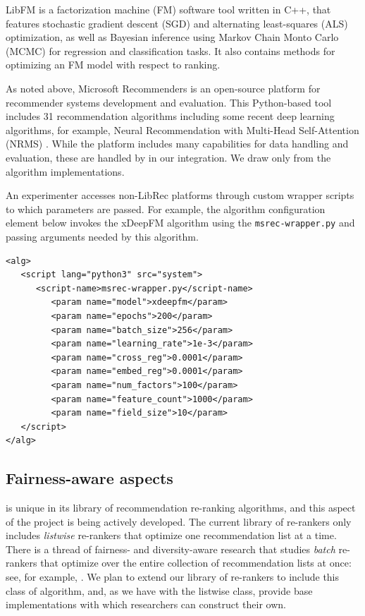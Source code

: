 LibFM\cite{rendle2012factorization} is a factorization machine (FM) software tool written in C++, that features stochastic gradient descent (SGD) and alternating least-squares (ALS) optimization, as well as Bayesian inference using Markov Chain Monto Carlo (MCMC) for regression and classification tasks. It also contains methods for optimizing an FM model with respect to ranking. 


As noted above, Microsoft Recommenders \cite{MicrosoftRecommenders} is an open-source platform for recommender systems development and evaluation. This Python-based tool includes 31 recommendation algorithms including some recent deep learning algorithms, for example, Neural Recommendation with Multi-Head Self-Attention (NRMS) \cite{wu2019neural}. While the platform includes many capabilities for data handling and evaluation, these are handled by \libauto{} in our integration. We draw only from the algorithm implementations. 

An experimenter accesses non-LibRec platforms through custom wrapper scripts to which parameters are passed. For example, the algorithm configuration element below invokes the xDeepFM algorithm using the \texttt{msrec-wrapper.py} and passing arguments needed by this algorithm.

{\small
\begin{verbatim}
<alg>
   <script lang="python3" src="system">
      <script-name>msrec-wrapper.py</script-name>
         <param name="model">xdeepfm</param>
         <param name="epochs">200</param>
         <param name="batch_size">256</param>
         <param name="learning_rate">1e-3</param>
         <param name="cross_reg">0.0001</param>
         <param name="embed_reg">0.0001</param>
         <param name="num_factors">100</param>
         <param name="feature_count">1000</param>
         <param name="field_size">10</param>
   </script>
</alg>
\end{verbatim}}

\subsection{Fairness-aware aspects}
\libauto{} is unique in its library of recommendation re-ranking algorithms, and this aspect of the project is being actively developed. The current library of re-rankers only includes \textit{listwise} re-rankers that optimize one recommendation list at a time. There is a thread of fairness- and diversity-aware research that studies \textit{batch} re-rankers that optimize over the entire collection of recommendation lists at once: see, for example, \cite{surer2018multistakeholder,patro2020fairrec,mansoury2020fairmatch}. We plan to extend our library of re-rankers to include this class of algorithm, and, as we have with the listwise class, provide base implementations with which researchers can construct their own.

